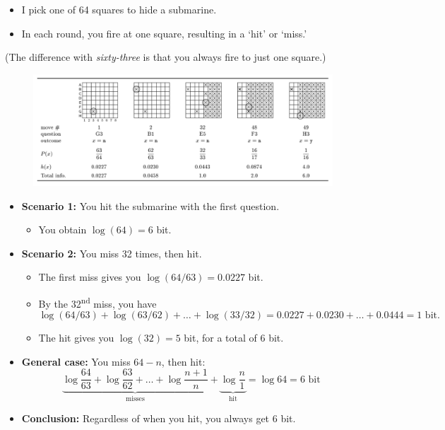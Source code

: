 \begin{itemize}
    \item I pick one of 64 squares to hide a submarine.
    \item In each round, you fire at one square, resulting in a ‘hit’ or ‘miss.’
\end{itemize}

(The difference with \textit{sixty-three} is that you always fire to just one square.)

\begin{figure}
    \centering
    \includegraphics[width=0.9\linewidth]{img/submarines.png}
\end{figure}

\begin{itemize}
    \item \textbf{Scenario 1:} You hit the submarine with the first question.
          \begin{itemize}
              \item You obtain \( \log(64) = 6 \) bit.
          \end{itemize}

    \item \textbf{Scenario 2:} You miss 32 times, then hit.
          \begin{itemize}
              \item The first miss gives you \( \log(64/63) = 0.0227 \) bit.
              \item By the 32\textsuperscript{nd} miss, you have
                    \[
                        \log(64/63) + \log(63/62) + \dots + \log(33/32) = 0.0227 + 0.0230 + \dots + 0.0444 = 1 \text{ bit}.
                    \]
              \item The hit gives you \( \log(32) = 5 \) bit, for a total of 6 bit.
          \end{itemize}

    \item \textbf{General case:} You miss \( 64 - n \), then hit:
          \[
              \underbrace{\log \frac{64}{63} + \log \frac{63}{62} + \dots + \log \frac{n+1}{n}}_{\text{misses}} + \underbrace{\log \frac{n}{1}}_{\text{hit}} = \log 64 = 6 \text{ bit}
          \]

    \item \textbf{Conclusion:} Regardless of when you hit, you always get 6 bit.
\end{itemize}

